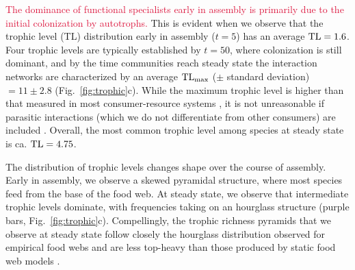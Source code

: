 \documentclass[twocolumn,preprintnumbers,amsmath,amssymb,superscriptaddress,linenumbers]{revtex4-1}
\newcommand{\rev}[1]{\textcolor{crimson}{#1}}
\begin{document}


\rev{The dominance of functional specialists early in assembly is primarily due to the initial colonization by autotrophs.}
This is evident when we observe that the trophic level (TL) distribution early in assembly ($t=5$) has an average ${\rm TL}=1.6$.
Four trophic levels are typically established by $t=50$, where colonization is still dominant, and by the time communities reach steady state the interaction networks are characterized by an average ${\rm TL_{max}}$ ($\pm$ standard deviation) $=11 \pm 2.8$ (Fig.\ \ref{fig:trophic}c).
While the maximum trophic level is higher than that measured in most consumer-resource systems \cite{Williams2002}, it is not unreasonable if parasitic interactions (which we do not differentiate from other consumers) are included \cite{Lafferty2006}.
Overall, the most common trophic level among species at steady state is ca. ${\rm TL}=4.75$. %

The distribution of trophic levels changes shape over the course of assembly.
Early in assembly, we observe a skewed pyramidal structure, where most species feed from the base of the food web.
At steady state, we observe that intermediate trophic levels dominate, with frequencies taking on an hourglass structure (purple bars, Fig.\ \ref{fig:trophic}c).
Compellingly, the trophic richness pyramids that we observe at steady state follow closely the hourglass distribution observed for empirical food webs and are less top-heavy than those produced by static food web models \cite{Turney2016}.\\
\end{document}
